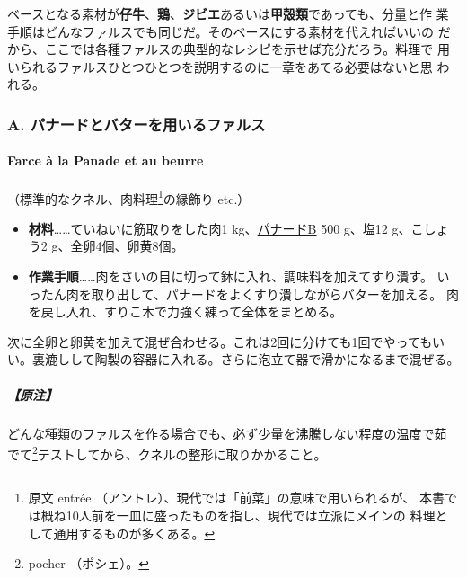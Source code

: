 ベースとなる素材が\textbf{仔牛}、\textbf{鶏}、\textbf{ジビエ}あるいは\textbf{甲殻類}であっても、分量と作
業手順はどんなファルスでも同じだ。そのベースにする素材を代えればいいの
だから、ここでは各種ファルスの典型的なレシピを示せば充分だろう。料理で
用いられるファルスひとつひとつを説明するのに一章をあてる必要はないと思
われる。
\begin{recette}
\hypertarget{a.-ux30d1ux30caux30fcux30c9ux3068ux30d0ux30bfux30fcux3092ux7528ux3044ux308bux30d5ux30a1ux30ebux30b9}{%
\subsubsection{A.
パナードとバターを用いるファルス}\label{a.-ux30d1ux30caux30fcux30c9ux3068ux30d0ux30bfux30fcux3092ux7528ux3044ux308bux30d5ux30a1ux30ebux30b9}}

\hypertarget{farce-uxe0-la-panade-et-au-beurre}{%
\paragraph{Farce à la Panade et au
beurre}\label{farce-uxe0-la-panade-et-au-beurre}}


（標準的なクネル、肉料理\footnote{原文 entrée
  （アントレ）、現代では「前菜」の意味で用いられるが、
  本書では概ね10人前を一皿に盛ったものを指し、現代では立派にメインの
  料理として通用するものが多くある。}の縁飾り etc.）

\begin{itemize}
\item
  \textbf{材料}\ldots{}\ldots{}ていねいに筋取りをした肉1
  kg、\protect\hyperlink{panade-b}{パナードB} 500 g、塩12 g、こしょう2
  g、全卵4個、卵黄8個。
\item
  \textbf{作業手順}\ldots{}\ldots{}肉をさいの目に切って鉢に入れ、調味料を加えてすり潰す。
  いったん肉を取り出して、パナードをよくすり潰しながらバターを加える。
  肉を戻し入れ、すりこ木で力強く練って全体をまとめる。
\end{itemize}

次に全卵と卵黄を加えて混ぜ合わせる。これは2回に分けても1回でやってもい
い。裏漉しして陶製の容器に入れる。さらに泡立て器で滑かになるまで混ぜる。

\hypertarget{ux539fux6ce8}{%
\subparagraph{【原注】}\label{ux539fux6ce8}}

どんな種類のファルスを作る場合でも、必ず少量を沸騰しない程度の温度で茹
でて\footnote{pocher （ポシェ）。}テストしてから、クネルの整形に取りかかること。
\end{recette}